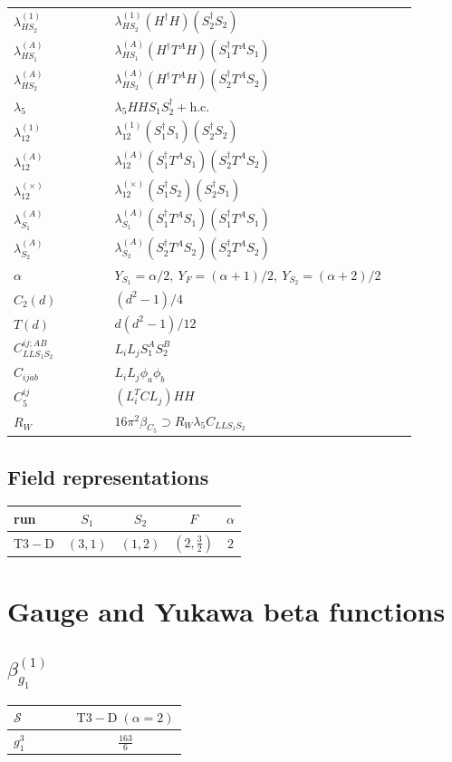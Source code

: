 \documentclass[9pt]{article}
\begin{document}
\begin{longtable}{@{}p{0.23\linewidth}p{0.69\linewidth}@{}}
$\lambda_{HS_2}^{(1)}$ & $\lambda_{HS_2}^{(1)}(H^\dagger H)(S_2^\dagger S_2)$ \\
$\lambda_{HS_1}^{(A)}$ & $\lambda_{HS_1}^{(A)}(H^\dagger T^AH)(S_1^\dagger T^AS_1)$ \\
$\lambda_{HS_2}^{(A)}$ & $\lambda_{HS_2}^{(A)}(H^\dagger T^AH)(S_2^\dagger T^AS_2)$ \\
$\lambda_5$ & $\lambda_5HHS_1S_2^\dagger+\mathrm{h.c.}$ \\
$\lambda_{12}^{(1)}$ & $\lambda_{12}^{(1)}(S_1^\dagger S_1)(S_2^\dagger S_2)$ \\
$\lambda_{12}^{(A)}$ & $\lambda_{12}^{(A)}(S_1^\dagger T^AS_1)(S_2^\dagger T^AS_2)$ \\
$\lambda_{12}^{(\times)}$ & $\lambda_{12}^{(\times)}(S_1^\dagger S_2)(S_2^\dagger S_1)$ \\
$\lambda_{S_1}^{(A)}$ & $\lambda_{S_1}^{(A)}(S_1^\dagger T^A S_1)(S_1^\dagger T^A S_1)$ \\
$\lambda_{S_2}^{(A)}$ & $\lambda_{S_2}^{(A)}(S_2^\dagger T^A S_2)(S_2^\dagger T^A S_2)$ \\
$\alpha$ & $Y_{S_1}=\alpha/2,\ Y_F=(\alpha+1)/2,\ Y_{S_2}=(\alpha+2)/2$ \\
$C_2(d)$ & $(d^2-1)/4$ \\
$T(d)$ & $d(d^2-1)/12$ \\
$C_{LLS_1S_2}^{ij;AB}$ & $L_iL_jS_1^AS_2^B$ \\
$C_{ijab}$ & $L_iL_j\phi_a\phi_b$ \\
$C_5^{ij}$ & $(L_i^TCL_j)HH$ \\
$R_W$ & $16\pi^2\beta_{C_5}\supset R_W\lambda_5C_{LLS_1S_2}$ \\
\bottomrule
\end{longtable}
\subsection*{Field representations}
\begin{longtable}{@{}lcccc@{}}
\toprule
run & $S_1$ & $S_2$ & $F$ & $\alpha$ \\
\midrule
$\mathrm{T3-D}$ & $(3,1)$ & $(1,2)$ & $(2,\frac{3}{2})$ & $2$ \\
\bottomrule
\end{longtable}
\section*{Gauge and Yukawa beta functions}
\subsection*{$ \beta_{g_1}^{(1)} $}
\begin{longtable}{@{}p{0.38\linewidth}c@{}}
\toprule
$\mathcal{S}$ & $ \mathrm{T3-D}\;(\alpha=2) $ \\
\midrule
$ g_1^3 $ & $ \frac{163}{6} $ \\
\bottomrule
\end{longtable}
\end{document}
